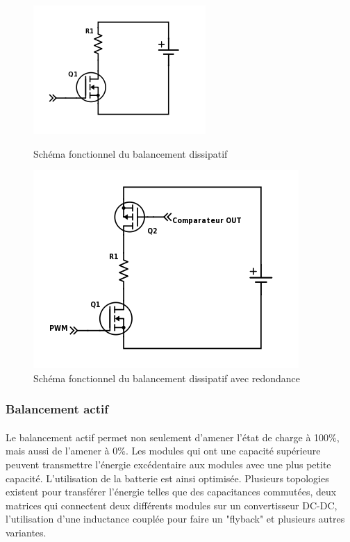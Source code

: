 \begin{figure}[H]
	\begin{minipage}{0.5\textwidth}
		\centering
		\includegraphics[scale=0.9]{Images/Dissipative_balancing.png}
		\caption{Schéma fonctionnel du balancement dissipatif}
		\label{fig:bal_dis}
	\end{minipage}
	\hfill
	\begin{minipage}{0.45\textwidth}
		\centering
		\includegraphics[scale=0.6]{Images/Dissipative_bal_comp.png}
		\caption{Schéma fonctionnel du balancement dissipatif avec redondance}
		\label{fig:bal_dis_comp}
	\end{minipage}	
\end{figure}

\subsubsection*{Balancement actif}
\paragraph*{}
Le balancement actif permet non seulement d'amener l'état de charge à 100\%, mais aussi de l'amener à 0\%. Les modules qui ont une capacité supérieure peuvent transmettre l'énergie excédentaire aux modules avec une plus petite capacité. L'utilisation de la batterie est ainsi optimisée. Plusieurs topologies existent pour transférer l'énergie telles que des capacitances commutées, deux matrices qui connectent deux différents modules sur un convertisseur DC-DC, l'utilisation d'une inductance couplée pour faire un "flyback" et plusieurs autres variantes. 

